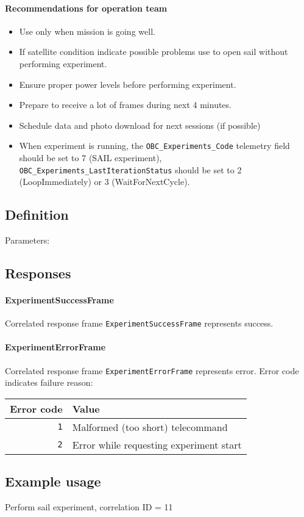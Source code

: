 \paragraph{Recommendations for operation team}
\begin{itemize}
	\item Use only when mission is going well.
	\item If satellite condition indicate possible problems use  to open sail without performing experiment.
	\item Ensure proper power levels before performing experiment.
	\item Prepare to receive a lot of frames during next 4 minutes.
	\item Schedule data and photo download for next sessions (if possible)
	\item When experiment is running, the \texttt{OBC_Experiments_Code} telemetry field should be set to 7 (SAIL experiment), \texttt{OBC_Experiments_LastIterationStatus} should be set to 2 (LoopImmediately) or 3 (WaitForNextCycle). 
\end{itemize}


\subsection{Definition}

Parameters: 

\begin{tcarglist}
\end{tcarglist}


\subsection{Responses}

\paragraph{ExperimentSuccessFrame}
Correlated response frame \texttt{ExperimentSuccessFrame} represents success. 

\paragraph{ExperimentErrorFrame}
Correlated response frame \texttt{ExperimentErrorFrame} represents error. Error code indicates failure reason:

\begin{tabular}{r | l}
	Error code & Value \\
	\hline
	\texttt{1} & Malformed (too short) telecommand \\	
	\texttt{2} & Error while requesting experiment start \\	
\end{tabular}


\subsection{Example usage}
Perform sail experiment, correlation ID = 11

